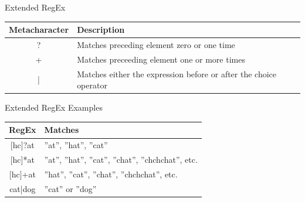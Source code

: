 \documentclass[ignorenonframetext,xcolor=x11names]{beamer}
\begin{document}
\begin{frame}{Extended RegEx}
\footnotesize
\renewcommand{\arraystretch}{1.5}
\begin{tabularx}{\textwidth}{c|X} \hline
{\bf Metacharacter} & {\bf Description} \\ \hline \hline
? & Matches preceding element zero or one time \\ \hline
+ & Matches preceeding element one or more times \\ \hline
| & Matches either the expression before or after the choice operator \\ \hline
\end{tabularx}
\end{frame}

\begin{frame}{Extended RegEx Examples}
\footnotesize
\renewcommand{\arraystretch}{1.5}

\begin{tabularx}{\textwidth}{c|X} \hline
{\bf RegEx} & {\bf Matches} \\ \hline \hline
$[$hc$]$?at & ''at'', ''hat'', ''cat'' \\ \hline
$[$hc$]$*at & ''at'', ''hat'', ''cat'', ''chat'', ''chchchat'', etc. \\ \hline
$[$hc$]$+at & ''hat'', ''cat'', ''chat'', ''chchchat'', etc. \\ \hline
cat|dog & ''cat'' or ''dog'' \\ \hline
\end{tabularx}
\end{frame}
\end{document}
